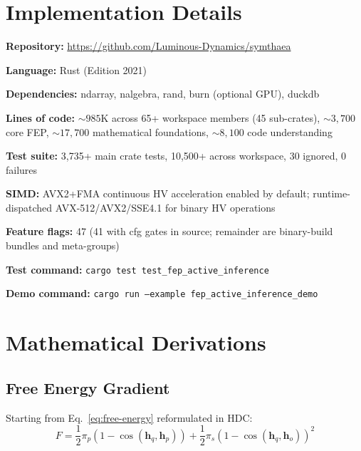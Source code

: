 \documentclass[10pt,letterpaper]{article}
\newcommand{\hvec}[1]{\mathbf{h}_{#1}}
\begin{document}



\appendix

\section{Implementation Details}
\label{app:implementation}

{\raggedright
\textbf{Repository:} \url{https://github.com/Luminous-Dynamics/symthaea}\par
\textbf{Language:} Rust (Edition 2021)\par
\textbf{Dependencies:} ndarray, nalgebra, rand, burn (optional GPU), duckdb\par
\textbf{Lines of code:} ${\sim}985$K across 65+ workspace members (45 sub-crates), ${\sim}3{,}700$ core FEP, ${\sim}17{,}700$ mathematical foundations, ${\sim}8{,}100$ code understanding\par
\textbf{Test suite:} 3,735+ main crate tests, 10,500+ across workspace, 30 ignored, 0 failures\par
\textbf{SIMD:} AVX2+FMA continuous HV acceleration enabled by default; runtime-dispatched AVX-512/AVX2/SSE4.1 for binary HV operations\par
\textbf{Feature flags:} 47 (41 with cfg gates in source; remainder are binary-build bundles and meta-groups)\par
\textbf{Test command:} \texttt{cargo test test\_fep\_active\_inference}\par
\textbf{Demo command:} \texttt{cargo run --example fep\_active\_inference\_demo}\par
}

\section{Mathematical Derivations}
\label{app:derivations}

\subsection{Free Energy Gradient}

Starting from Eq.~\ref{eq:free-energy} reformulated in HDC:
\begin{equation}
F = \frac{1}{2}\pi_p(1 - \cos(\hvec{q}, \hvec{p})) + \frac{1}{2}\pi_s(1 - \cos(\hvec{q}, \hvec{o}))^2
\end{equation}
\end{document}
